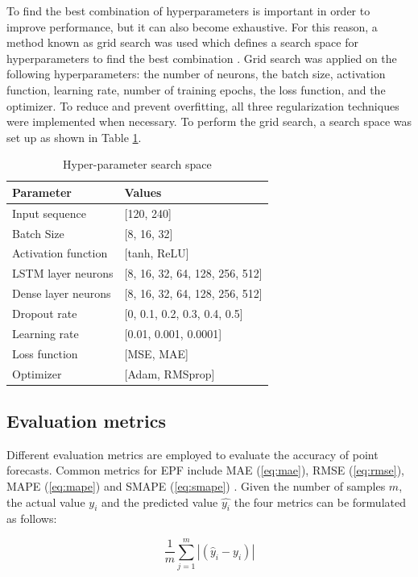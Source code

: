 To find the best combination of hyperparameters is important in order to improve performance, but it can also become exhaustive. For this reason, a method known as grid search \cite{gridSearch} was used which defines a search space for hyperparameters to find the best combination \cite{gridSearch, diveLSTM}. Grid search was applied on the following hyperparameters: the number of neurons, the batch size, activation function, learning rate, number of training epochs, the loss function, and the optimizer. To reduce and prevent overfitting, all three regularization techniques were implemented when necessary. To perform the grid search, a search space was set up as shown in Table \ref{tab:hyperparams}.

\begin{table}[H]
  \caption{Hyper-parameter search space}
  \label{tab:hyperparams}
  \centering
  \begin{tabular}{ll}
    \hline
    Parameter & Values \\
    \hline
    Input sequence & [120, 240] \\
    Batch Size & [8, 16, 32] \\
    Activation function & [tanh, ReLU] \\
    LSTM layer neurons & [8, 16, 32, 64, 128, 256, 512] \\
    Dense layer neurons & [8, 16, 32, 64, 128, 256, 512] \\
    Dropout rate & [0, 0.1, 0.2, 0.3, 0.4, 0.5] \\
    Learning rate & [0.01, 0.001, 0.0001] \\
    Loss function & [MSE, MAE] \\
    Optimizer & [Adam, RMSprop] \\
    \hline
  \end{tabular}
\end{table}

\subsection{Evaluation metrics}
Different evaluation metrics are employed to evaluate the accuracy of point forecasts. Common metrics for EPF include MAE (\ref{eq:mae}), RMSE (\ref{eq:rmse}), MAPE (\ref{eq:mape}) and SMAPE (\ref{eq:smape}) \cite{LAGO2021116983}. Given the number of samples $m$, the actual value $y_{i}$ and the predicted value $\hat{y_{i}}$ the four metrics can be formulated as follows: 

\begin{equation}\label{eq:mae}
    \frac{1}{m} \sum_{j=1}^m |(\hat{y}_{i}-y_{i})|
\end{equation}

